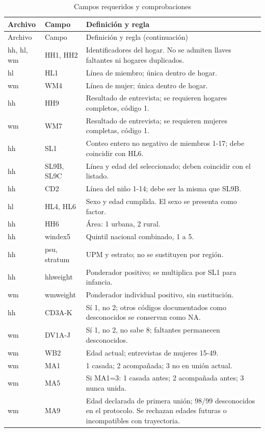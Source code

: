 \documentclass[11pt,a4paper]{article}
\begin{document}
\begin{longtable}{@{}p{2.4cm}p{2.6cm}p{9.9cm}@{}}
\caption{Campos requeridos y comprobaciones}\label{tab:diccionario}\\
\toprule Archivo & Campo & Definición y regla\\\midrule\endfirsthead
\toprule Archivo & Campo & Definición y regla (continuación)\\\midrule\endhead
\bottomrule\endfoot
hh, hl, wm & HH1, HH2 & Identificadores del hogar. No se admiten llaves faltantes ni hogares duplicados.\\
hl & HL1 & Línea de miembro; única dentro de hogar.\\
wm & WM4 & Línea de mujer; única dentro de hogar.\\
hh & HH9 & Resultado de entrevista; se requieren hogares completos, código 1.\\
wm & WM7 & Resultado de entrevista; se requieren mujeres completas, código 1.\\
hh & SL1 & Conteo entero no negativo de miembros 1-17; debe coincidir con HL6.\\
hh & SL9B, SL9C & Línea y edad del seleccionado; deben coincidir con el listado.\\
hh & CD2 & Línea del niño 1-14; debe ser la misma que SL9B.\\
hl & HL4, HL6 & Sexo y edad cumplida. El sexo se presenta como factor.\\
hh & HH6 & Área: 1 urbana, 2 rural.\\
hh & windex5 & Quintil nacional combinado, 1 a 5.\\
hh & psu, stratum & UPM y estrato; no se sustituyen por región.\\
hh & hhweight & Ponderador positivo; se multiplica por SL1 para infancia.\\
wm & wmweight & Ponderador individual positivo, sin sustitución.\\
hh & CD3A-K & Sí 1, no 2; otros códigos documentados como desconocidos se conservan como NA.\\
wm & DV1A-J & Sí 1, no 2, no sabe 8; faltantes permanecen desconocidos.\\
wm & WB2 & Edad actual; entrevistas de mujeres 15-49.\\
wm & MA1 & 1 casada; 2 acompañada; 3 no en unión actual.\\
wm & MA5 & Si MA1=3: 1 casada antes; 2 acompañada antes; 3 nunca unida.\\
wm & MA9 & Edad declarada de primera unión; 98/99 desconocidos en el protocolo. Se rechazan edades futuras o incompatibles con trayectoria.\\
\end{longtable}
\end{document}
